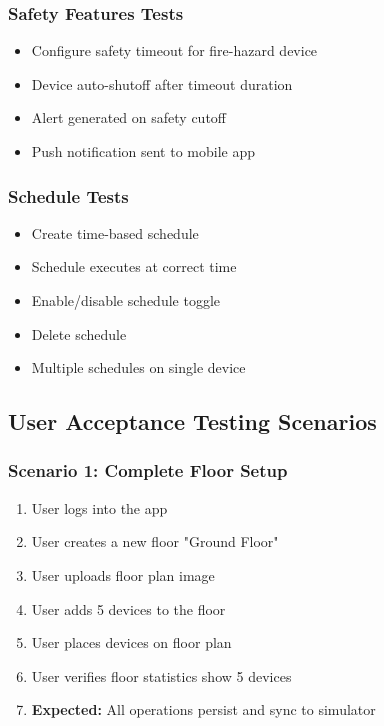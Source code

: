 \documentclass[12pt,a4paper]{article}
\begin{document}
\subsubsection{Safety Features Tests}
\begin{itemize}[leftmargin=*]
    \item[$\square$] Configure safety timeout for fire-hazard device
    \item[$\square$] Device auto-shutoff after timeout duration
    \item[$\square$] Alert generated on safety cutoff
    \item[$\square$] Push notification sent to mobile app
\end{itemize}

\subsubsection{Schedule Tests}
\begin{itemize}[leftmargin=*]
    \item[$\square$] Create time-based schedule
    \item[$\square$] Schedule executes at correct time
    \item[$\square$] Enable/disable schedule toggle
    \item[$\square$] Delete schedule
    \item[$\square$] Multiple schedules on single device
\end{itemize}


\subsection{User Acceptance Testing Scenarios}

\subsubsection{Scenario 1: Complete Floor Setup}
\begin{enumerate}
    \item User logs into the app
    \item User creates a new floor "Ground Floor"
    \item User uploads floor plan image
    \item User adds 5 devices to the floor
    \item User places devices on floor plan
    \item User verifies floor statistics show 5 devices
    \item \textbf{Expected:} All operations persist and sync to simulator
\end{enumerate}
\end{document}

